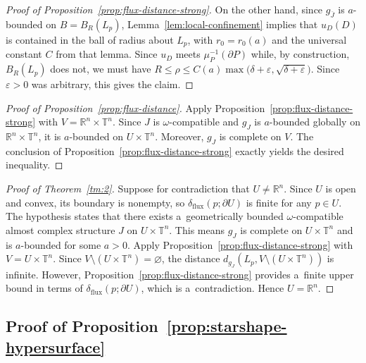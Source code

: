 \documentclass[pdftex]{sigma}
\numberwithin{equation}{section}
\newcommand{\bR}{{\mathbb R}}
\newcommand{\bT}{{\mathbb T}}
\theoremstyle{definition}
\begin{document}
\begin{proof}[Proof of Proposition~\ref{prop:flux-distance-strong}]
On the other hand, since $g_{\overline{J}}$ is $a$-bounded on $B=B_R(L_p)$, Lemma~\ref{lem:local-confinement} implies that $u_D(D)$ is contained in the ball of radius  about $L_p$, with $r_0=r_0(a)$ and the universal constant $C$ from that lemma. Since $u_D$ meets $\mu_P^{-1}(\partial P)$ while, by construction, $B_R(L_p)$ does not, we must have $R\le\rho\le C(a)\max\bigl(\delta+\varepsilon,\sqrt{\delta+\varepsilon}\bigr)$.
Since $\varepsilon>0$ was arbitrary, this gives the claim.
\end{proof}

\begin{proof}[Proof of Proposition~\ref{prop:flux-distance}]
Apply Proposition~\ref{prop:flux-distance-strong} with $V = \bR^n\times\bT^n$. Since $J$ is $\omega$-compatible and $g_J$ is $a$-bounded globally on $\bR^n\times\bT^n$, it is $a$-bounded on $U\times\bT^n$. Moreover, $g_J$ is complete on $V$. The conclusion of Proposition~\ref{prop:flux-distance-strong} exactly yields the desired inequality.
\end{proof}

\begin{proof}[Proof of Theorem~\ref{tm:2}]
Suppose for contradiction that $U\neq \bR^n$. Since $U$ is open and convex, its boundary is nonempty, so $\delta_{\mathrm{flux}}(p;\partial U)$ is finite for any $p\in U$.
The hypothesis states that there exists a~geometrically bounded $\omega$-compatible almost complex structure $J$ on $U\times\bT^n$. This means $g_J$ is complete on $U\times\bT^n$ and is $a$-bounded for some $a>0$.
Apply Proposition~\ref{prop:flux-distance-strong} with~${V = U\times\bT^n}$. Since $V\setminus (U\times\bT^n) = \varnothing$, the distance $d_{g_J}(L_p, V\setminus (U\times\bT^n))$ is infinite. However, Proposition~\ref{prop:flux-distance-strong} provides a~finite upper bound in terms of $\delta_{\mathrm{flux}}(p;\partial U)$, which is a~contradiction. Hence $U=\bR^n$.
\end{proof}


\subsection{Proof of Proposition~\ref{prop:starshape-hypersurface}}
\end{document}
